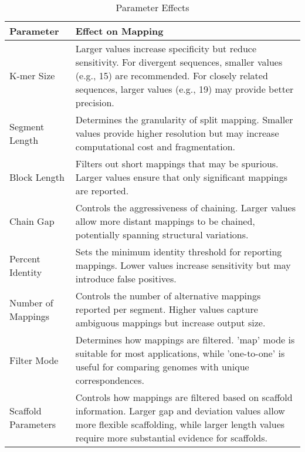 \documentclass{article}
\begin{document}
\begin{table}[htbp]
\centering
\begin{tabular}{@{}lp{10cm}@{}}
\toprule
\textbf{Parameter} & \textbf{Effect on Mapping} \\
\midrule
K-mer Size & Larger values increase specificity but reduce sensitivity. For divergent sequences, smaller values (e.g., 15) are recommended. For closely related sequences, larger values (e.g., 19) may provide better precision. \\
\addlinespace
Segment Length & Determines the granularity of split mapping. Smaller values provide higher resolution but may increase computational cost and fragmentation. \\
\addlinespace
Block Length & Filters out short mappings that may be spurious. Larger values ensure that only significant mappings are reported. \\
\addlinespace
Chain Gap & Controls the aggressiveness of chaining. Larger values allow more distant mappings to be chained, potentially spanning structural variations. \\
\addlinespace
Percent Identity & Sets the minimum identity threshold for reporting mappings. Lower values increase sensitivity but may introduce false positives. \\
\addlinespace
Number of Mappings & Controls the number of alternative mappings reported per segment. Higher values capture ambiguous mappings but increase output size. \\
\addlinespace
Filter Mode & Determines how mappings are filtered. 'map' mode is suitable for most applications, while 'one-to-one' is useful for comparing genomes with unique correspondences. \\
\addlinespace
Scaffold Parameters & Controls how mappings are filtered based on scaffold information. Larger gap and deviation values allow more flexible scaffolding, while larger length values require more substantial evidence for scaffolds. \\
\bottomrule
\end{tabular}
\caption{Parameter Effects}
\label{tab:param-effects}
\end{table}
\end{document}
